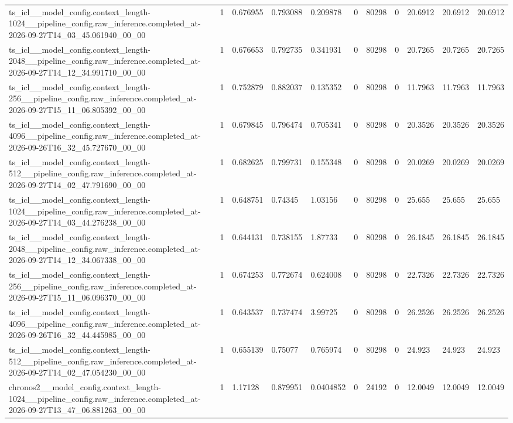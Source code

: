 \begin{tabular}{lllllllllll}
ts\_icl\_\_model\_config.context\_length-1024\_\_pipeline\_config.raw\_inference.completed\_at-2026-09-27T14\_03\_45.061940\_00\_00 & 1 & 0.676955 & 0.793088 & 0.209878 & 0 & 80298 & 0 & 20.6912 & 20.6912 & 20.6912 \\
ts\_icl\_\_model\_config.context\_length-2048\_\_pipeline\_config.raw\_inference.completed\_at-2026-09-27T14\_12\_34.991710\_00\_00 & 1 & 0.676653 & 0.792735 & 0.341931 & 0 & 80298 & 0 & 20.7265 & 20.7265 & 20.7265 \\
ts\_icl\_\_model\_config.context\_length-256\_\_pipeline\_config.raw\_inference.completed\_at-2026-09-27T15\_11\_06.805392\_00\_00 & 1 & 0.752879 & 0.882037 & 0.135352 & 0 & 80298 & 0 & 11.7963 & 11.7963 & 11.7963 \\
ts\_icl\_\_model\_config.context\_length-4096\_\_pipeline\_config.raw\_inference.completed\_at-2026-09-26T16\_32\_45.727670\_00\_00 & 1 & 0.679845 & 0.796474 & 0.705341 & 0 & 80298 & 0 & 20.3526 & 20.3526 & 20.3526 \\
ts\_icl\_\_model\_config.context\_length-512\_\_pipeline\_config.raw\_inference.completed\_at-2026-09-27T14\_02\_47.791690\_00\_00 & 1 & 0.682625 & 0.799731 & 0.155348 & 0 & 80298 & 0 & 20.0269 & 20.0269 & 20.0269 \\
ts\_icl\_\_model\_config.context\_length-1024\_\_pipeline\_config.raw\_inference.completed\_at-2026-09-27T14\_03\_44.276238\_00\_00 & 1 & 0.648751 & 0.74345 & 1.03156 & 0 & 80298 & 0 & 25.655 & 25.655 & 25.655 \\
ts\_icl\_\_model\_config.context\_length-2048\_\_pipeline\_config.raw\_inference.completed\_at-2026-09-27T14\_12\_34.067338\_00\_00 & 1 & 0.644131 & 0.738155 & 1.87733 & 0 & 80298 & 0 & 26.1845 & 26.1845 & 26.1845 \\
ts\_icl\_\_model\_config.context\_length-256\_\_pipeline\_config.raw\_inference.completed\_at-2026-09-27T15\_11\_06.096370\_00\_00 & 1 & 0.674253 & 0.772674 & 0.624008 & 0 & 80298 & 0 & 22.7326 & 22.7326 & 22.7326 \\
ts\_icl\_\_model\_config.context\_length-4096\_\_pipeline\_config.raw\_inference.completed\_at-2026-09-26T16\_32\_44.445985\_00\_00 & 1 & 0.643537 & 0.737474 & 3.99725 & 0 & 80298 & 0 & 26.2526 & 26.2526 & 26.2526 \\
ts\_icl\_\_model\_config.context\_length-512\_\_pipeline\_config.raw\_inference.completed\_at-2026-09-27T14\_02\_47.054230\_00\_00 & 1 & 0.655139 & 0.75077 & 0.765974 & 0 & 80298 & 0 & 24.923 & 24.923 & 24.923 \\
chronos2\_\_model\_config.context\_length-1024\_\_pipeline\_config.raw\_inference.completed\_at-2026-09-27T13\_47\_06.881263\_00\_00 & 1 & 1.17128 & 0.879951 & 0.0404852 & 0 & 24192 & 0 & 12.0049 & 12.0049 & 12.0049 \\

\end{tabular}
